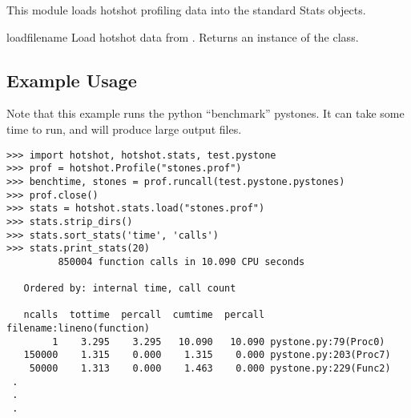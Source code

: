 This module loads hotshot profiling data into the standard 
Stats objects.

\begin{funcdesc}{load}{filename}
Load hotshot data from . Returns an instance
of the  class.
\end{funcdesc}

\begin{seealso}
\end{seealso}


\subsection{Example Usage \label{hotshot-example}}

Note that this example runs the python ``benchmark'' pystones.  It can
take some time to run, and will produce large output files.

\begin{verbatim}
>>> import hotshot, hotshot.stats, test.pystone
>>> prof = hotshot.Profile("stones.prof")
>>> benchtime, stones = prof.runcall(test.pystone.pystones)
>>> prof.close()
>>> stats = hotshot.stats.load("stones.prof")
>>> stats.strip_dirs()
>>> stats.sort_stats('time', 'calls')
>>> stats.print_stats(20)
         850004 function calls in 10.090 CPU seconds

   Ordered by: internal time, call count

   ncalls  tottime  percall  cumtime  percall filename:lineno(function)
        1    3.295    3.295   10.090   10.090 pystone.py:79(Proc0)
   150000    1.315    0.000    1.315    0.000 pystone.py:203(Proc7)
    50000    1.313    0.000    1.463    0.000 pystone.py:229(Func2)
 .
 .
 .
\end{verbatim}
